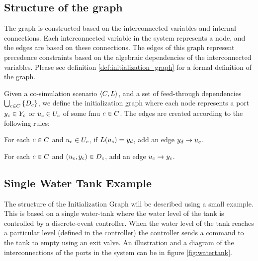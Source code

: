 \documentclass[runningheads]{llncs}
\begin{document}
\subsection{Structure of the graph}
The graph is constructed based on the interconnected variables and internal connections. Each interconnected variable in the system represents a node, and the edges are based on these connections. The edges of this graph represent precedence constraints based on the algebraic dependencies of the interconnected variables. Please see definition \ref{def:initialization_graph} for a formal definition of the graph.

\begin{definition}\label{def:initialization_graph}
  Given a co-simulation scenario $ \left\langle C, L \right\rangle $, and a set of feed-through dependencies $\bigcup_{c \in C}  \left\{ D_{c} \right\}$, we define the initialization graph where each node represents a port $y_{c} \in Y_{c}$ or $u_{c} \in U_{c}$ of some fmu $c \in C$. The edges are created according to the following rules:
  \begin{compactenum}
    \item For each $c \in C$ and $u_{c} \in U_{c}$, if $L(u_{c}) = y_{d}$, add an edge $y_{d} -> u_{c}$.
    \item For each $c \in C$ and $(u_{c},y_{c}) \in D_{c}$, add an edge $u_{c} -> y_{c}$.
  \end{compactenum}
\end{definition}

\subsection{Single Water Tank Example}
The structure of the Initialization Graph will be described using a small example. This is based on a single water-tank where the water level of the tank is controlled by a discrete-event controller. When the water level of the tank reaches a particular level (defined in the controller) the controller sends a command to the tank to empty using an exit valve. An illustration and a diagram of the interconnections of the ports in the system can be in figure \ref{fig:watertank}.
\end{document}
